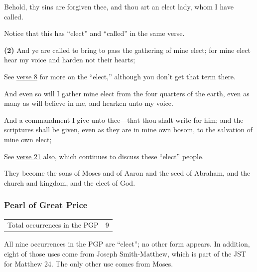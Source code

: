			\begin{compactdesc}
				\item[{\hyperref[DC25-3]{DC 25:3}}] Behold, thy sins are forgiven thee, and thou art an elect lady, whom I have called.
					\begin{compactitem}
						\item Notice that this has ``elect'' and ``called'' in the same verse.
					\end{compactitem}
				\item[{\hyperref[DC29-7]{DC 29:7}}] \textbf{(2)} And ye are called to bring to pass the gathering of mine elect; for mine elect hear my voice and harden not their hearts;
					\begin{compactitem}
						\item See \hyperref[DC29-8]{verse 8} for more on the ``elect,'' although you don't get that term there.
					\end{compactitem}
				\item[{\hyperref[DC33-6]{DC 33:6}}] And even so will I gather mine elect from the four quarters of the earth, even as many as will believe in me, and hearken unto my voice.
				\item[{\hyperref[DC35-20]{DC 35:20}}] And a commandment I give unto thee—that thou shalt write for him; and the scriptures shall be given, even as they are in mine own bosom, to the salvation of mine own elect;
					\begin{compactitem}
						\item See \hyperref[DC35-21]{verse 21} also, which continues to discuss these ``elect'' people.
					\end{compactitem}
				\item[{\hyperref[DC84-34]{DC 84:34}}] They become the sons of Moses and of Aaron and the seed of Abraham, and the church and kingdom, and the elect of God.
			\end{compactdesc}
		
	\subsubsection{Pearl of Great Price} %
		\label{ELECTION-PGP}
	
		\begin{tabular}{ll}
			Total occurrences in the PGP & 9
		\end{tabular}
		
		All nine occurrences in the PGP are ``elect''; no other form appears. In addition, eight of those uses come from Joseph Smith-Matthew, which is part of the JST for Matthew 24. The only other use comes from Moses.
		
